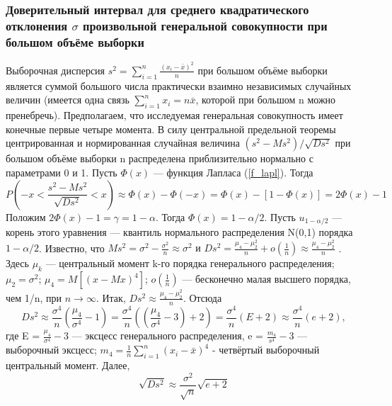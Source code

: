 \documentclass[a4paper,14pt]{article}
\begin{document}
	\subsubsection{Доверительный интервал для среднего квадратического отклонения $\sigma$ произвольной генеральной совокупности при большом объёме выборки}
	Выборочная дисперсия $s^{2} = \sum_{i = 1}^{n}{\frac{(x_{i} - \bar{x})^{2}}{n}}$ при большом объёме выборки является суммой большого числа практически взаимно независимых случайных величин (имеется одна связь $\sum_{i=1}^{n}{x_{i}} = n\bar{x}$, которой при большом n можно пренебречь). Предполагаем, что исследуемая генеральная совокупность имеет конечные первые четыре момента.
	\newline
	В силу центральной предельной теоремы центрированная и нормированная случайная величина $(s^{2}-Ms^{2})/\sqrt{D s^{2}}$ при большом объёме выборки n распределена приблизительно нормально с параметрами 0 и 1. Пусть $\Phi(x)$ — функция Лапласа (\ref{f_lapl}). Тогда
	\begin{equation}
		P\left(-x < \frac{s^{2}-Ms^{2}}{\sqrt{D s^{2}}} < x\right)
		\approx \Phi(x) - \Phi(-x)=\Phi(x) - [1 - \Phi(x)] = 2\Phi(x) - 1
		\label{P_as_sigma}
	\end{equation}
	Положим $2\Phi(x)-1 = \gamma = 1-\alpha$. Тогда $\Phi(x) = 1-\alpha/2$. Пусть $u_{1-\alpha/2}$ — корень этого уравнения — квантиль нормального распределения N(0,1) порядка $1-\alpha/2$. Известно, что $Ms^{2} = \sigma^{2} -\frac{\sigma^{2}}{n} \approx \sigma^{2} \text{ и } D s^{2} = \frac{\mu_{4} -\mu_{2}^{2}}{n} + o(\frac{1}{n}) \approx \frac{\mu_{4} -\mu_{2}^{2}}{n}$ . Здесь $\mu_{k}$ — центральный момент k-го порядка генерального распределения; $\mu_{2} = \sigma^{2}$; $\mu_{4} = M[{(x-M x)}^{4}]$; $o(\frac{1}{n})$ — бесконечно малая высшего порядка, чем 1/n, при $n\rightarrow \infty$. Итак, $D s^{2} \approx \frac{\mu_{4} -\mu_{2}^{2}}{n}$. Отсюда
	\begin{equation}
		D s^{2} \approx \frac{\sigma^{4}}{n}(\frac{\mu_{4}}{\sigma^{4}} - 1) = 
		\frac{\sigma^{4}}{n}((\frac{\mu_{4}}{\sigma^{4}} - 3) + 2) = \frac{\sigma^{4}}{n}(E + 2) \approx \frac{\sigma^{4}}{n}(e + 2),
		\label{Ds_2}
	\end{equation}
	где E = $\frac{\mu_{4}}{\sigma^{4}} - 3$ — эксцесс генерального распределения, e = $\frac{m_{4}}{s^{4}} - 3$ — выборочный эксцесс; $m_{4} = \frac{1}{n}\sum_{i =1}^{n}{(x_{i} - \bar{x})^{4}}$  - четвёртый выборочный центральный момент. Далее,
	\begin{equation}
		\sqrt{D s^{2}} \approx \frac{\sigma^{2}}{\sqrt{n}}\sqrt{e + 2}
		\label{sqrt_Ds}
	\end{equation}
\end{document}
